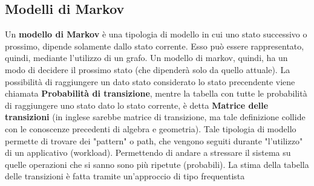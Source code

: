 \subsection{Modelli di Markov}
Un \textbf{modello di Markov} è una tipologia di modello in cui uno stato successivo o prossimo, dipende solamente dallo stato corrente. Esso può essere rappresentato, quindi, mediante l'utilizzo di un grafo. Un modello di markov, quindi, ha un modo di decidere il prossimo stato (che dipenderà solo da quello attuale). La possibilità di raggiungere un dato stato considerato lo stato precendente viene chiamata \textbf{Probabilità di transizione}, mentre la tabella con tutte le probabilità di raggiungere uno stato dato lo stato corrente, è detta \textbf{Matrice delle transizioni} (in inglese sarebbe matrice di transizione, ma tale definizione collide con le conoscenze precedenti di algebra e geometria). Tale tipologia di modello permette di trovare dei "pattern" o path, che vengono seguiti durante "l'utilizzo" di un applicativo (workload). Permettendo di andare a stressare il sistema su quelle operazioni che si sanno sono più ripetute (probabili). La stima della tabella delle transizioni è fatta tramite un'approccio di tipo frequentista

